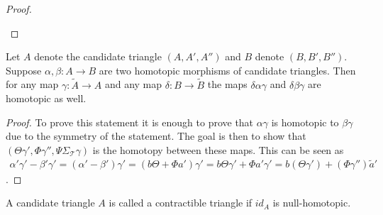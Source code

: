 \begin{proof}
\begin{center}
        \end{center}
    \end{proof}

    \begin{lemma}
        Let $A$ denote the candidate triangle $(A,A',A'')$ and $B$ denote $(B,B',B'')$. Suppose $\alpha, \beta : A \rightarrow B$ are two homotopic morphisms of candidate triangles. Then for any map $\gamma : \widetilde{A} \rightarrow A$ and any map $\delta : B \rightarrow \widetilde{B}$ the maps $\delta\alpha\gamma$ and $\delta\beta\gamma$ are homotopic as well.
    \end{lemma}

    \begin{proof}
        To prove this statement it is enough to prove that $\alpha\gamma$ is homotopic to $\beta\gamma$ due to the symmetry of the statement. The goal is then to show that $(\Theta\gamma ',\Phi\gamma '',\Psi \Sigma_{\mathcal{T}}\gamma)$ is the homotopy between these maps. This can be seen as
        \begin{multline*}
            {\alpha}'{\gamma}'-{\beta}'{\gamma}' = ({\alpha}'-{\beta}'){\gamma}' = (b\Theta +\Phi a'){\gamma}' = b\Theta {\gamma}' + \Phi a'{\gamma}' = b({\Theta}{\gamma}') + ({\Phi}{\gamma}'')\widetilde{a}'
        \end{multline*}.
    \end{proof}

    \begin{definition}
        A candidate triangle $A$ is called a contractible triangle if $id_A$ is null-homotopic.
    \end{definition}

